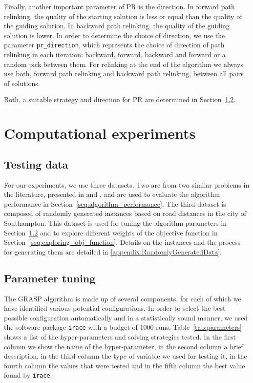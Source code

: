 \documentclass[a4paper,11pt]{elsarticle}
\begin{document}
Finally, another important parameter of PR is the direction. In forward path relinking, the quality of the starting solution is less or equal than the quality of the guiding solution. In backward path relinking, the quality of the guiding solution is lower. In order to determine the choice of direction, we use the parameter \texttt{pr\_direction}, which represents the choice of direction of path relinking in each iteration: backward, forward, backward and forward or a random pick between them. For relinking at the end of the algorithm we always use both, forward path relinking and backward path relinking, between all pairs of solutions.

Both, a suitable strategy and direction for PR are determined in Section~\ref{seq:parameter_tuning}.

\section{Computational experiments}\label{seq:Computational Experiments}
\subsection{Testing data}
For our experiments, we use three datasets. Two are from two similar problems in the literature, presented in \cite{Mankowska2014} and \cite{AitHaddadene2016}, and are used to evaluate the algorithm performance in Section~\ref{seq:algorithm_performance}. The third dataset is composed of randomly generated instances based on road distances in the city of Southampton. This dataset is used for tuning the algorithm parameters in Section~\ref{seq:parameter_tuning} and to explore different weights of the objective function in Section~\ref{seq:exploring_obj_function}. Details on the instances and the process for generating them are detailed in \ref{appendix:RandomlyGeneratedData}.

\subsection{Parameter tuning}\label{seq:parameter_tuning}
The GRASP algorithm is made up of several components, for each of which we have identified various potential configurations. %
In order to select the best possible configuration automatically and in a statistically sound manner, we used the software package \texttt{irace} \citep{Lopez-Ibanez2016} with a budget of 1000 runs. Table~\ref{tab:parameters} shows a list of the hyper-parameters and solving strategies tested. In the first column we show the name of the hyper-parameter, in the second column a brief description, in the third column the type of variable we used for testing it, in the fourth column the values that were tested and in the fifth column the best value found by \texttt{irace}.
\end{document}

